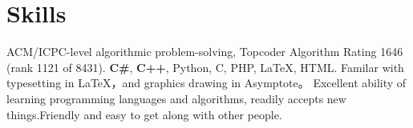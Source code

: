 \documentclass[10pt,a4paper,roman]{moderncv} %
\begin{document}
\section{Skills}
       {ACM/ICPC-level algorithmic problem-solving, Topcoder Algorithm Rating 1646 (rank 1121 of 8431).}
       {\textbf{C\#}, \textbf{C++}, Python, C, PHP, \LaTeX, HTML.} %
       {Familar with typesetting in \LaTeX，and graphics drawing in Asymptote。}
       {Excellent ability of learning programming languages and algorithms, readily accepts new things.\newline{}Friendly and easy to get along with other people.}
\end{document}
